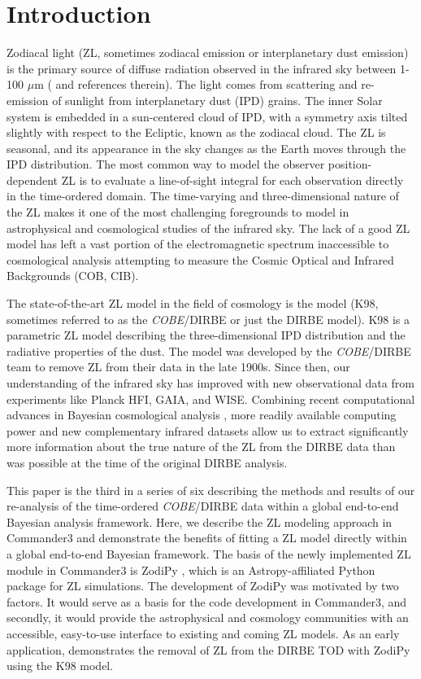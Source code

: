 \documentclass[twocolumn]{aa}
\begin{document}
\setcounter{tocdepth}{2}
\tableofcontents
   

\section{Introduction}
Zodiacal light (ZL, sometimes zodiacal emission or interplanetary dust 
emission) is the primary source of diffuse radiation observed in the 
infrared sky between 1-100 $\mu$m (\cite{Leinert1998} and references 
therein). The light comes from scattering and re-emission of sunlight 
from interplanetary dust (IPD) grains. The inner Solar system is 
embedded in a sun-centered cloud of IPD, with a symmetry axis tilted 
slightly with respect to the Ecliptic, known as the zodiacal cloud. The 
ZL is seasonal, and its appearance in the sky changes as the Earth moves 
through the IPD distribution. The most common way to model the observer 
position-dependent ZL is to evaluate a line-of-sight integral for each 
observation directly in the time-ordered domain. The time-varying and 
three-dimensional nature of the ZL makes it one of the most challenging 
foregrounds to model in astrophysical and cosmological studies of the 
infrared sky. The lack of a good ZL model has left a vast portion of the 
electromagnetic spectrum inaccessible to cosmological analysis 
attempting to measure the Cosmic Optical and Infrared Backgrounds (COB, 
CIB). 

The state-of-the-art ZL model in the field of cosmology is the 
\cite{Kelsall1998} model (K98, sometimes referred to as the 
\textit{COBE}/DIRBE or just the DIRBE model). K98 is a parametric ZL 
model describing the three-dimensional IPD distribution and the 
radiative properties of the dust. The model was developed by the 
\textit{COBE}/DIRBE team to remove ZL from their data in the late 1900s.
 Since then, our understanding of the infrared sky has improved with new 
 observational data from experiments like Planck HFI, GAIA, and WISE. 
 Combining recent computational advances in Bayesian cosmological 
 analysis \citep{BP2023, Galloway2023, Watts2023}, more readily 
 available computing power and new complementary infrared datasets 
 allow us to extract significantly more information about the true 
 nature of the ZL from the DIRBE data than was possible at the time 
 of the original DIRBE analysis.

This paper is the third in a series of six describing the methods and 
results of our re-analysis of the time-ordered \textit{COBE}/DIRBE data 
within a global end-to-end Bayesian analysis framework. Here, we 
describe the ZL modeling approach in Commander3 and demonstrate the 
benefits of fitting a ZL model directly within a global end-to-end 
Bayesian framework. The basis of the newly implemented ZL module in 
Commander3 is ZodiPy \citep{San2024}, which is an Astropy-affiliated 
Python package for ZL simulations. The development of ZodiPy was 
motivated by two factors. It would serve as a basis for the code 
development in Commander3, and secondly, it would provide the 
astrophysical and cosmology communities with an accessible, easy-to-use 
interface to existing and coming ZL models. As an early application, 
\cite{San2022} demonstrates the removal of ZL from the DIRBE TOD with 
ZodiPy using the K98 model.
\end{document}
